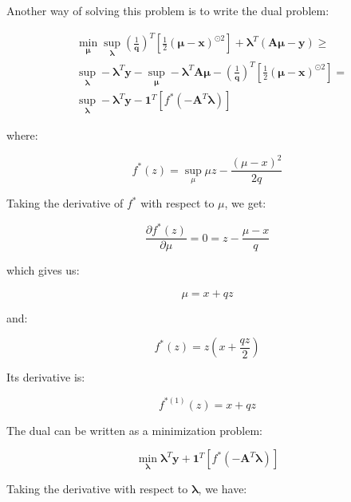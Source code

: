 \documentclass{tex/note}
\begin{document}
Another way of solving this problem is to write the dual problem:

\begin{align*}
& \min_{\bm{\mu}} \sup_{\bm{\lambda}} \left( \frac{1}{\bm{q}} \right)^T \left[ \frac{1}{2} \left( \bm{\mu} - \bm{x} \right)^{\odot 2} \right] + \bm{\lambda}^T \left( \bm{A} \bm{\mu} - \bm{y} \right) \geq \\
& \sup_{\bm{\lambda}} - \bm{\lambda}^T \bm{y} - \sup_{\bm{\mu}} - \bm{\lambda}^T \bm{A} \bm{\mu} - \left( \frac{1}{\bm{q}} \right)^T \left[ \frac{1}{2} \left( \bm{\mu} - \bm{x} \right)^{\odot 2} \right] = \\
& \sup_{\bm{\lambda}} - \bm{\lambda}^T \bm{y} -  \bm{1}^T \left[ f^* \left( - \bm{A}^T \bm{\lambda} \right) \right]
\end{align*}

where:

\begin{equation*}
f^* \left( z \right) = \sup_{\mu} \mu z - \frac{\left( \mu - x \right)^2}{2 q}
\end{equation*}

Taking the derivative of $f^*$ with respect to $\mu$, we get:

\begin{equation*}
\frac{\partial f^* \left( z \right)}{\partial \mu} = 0 = z - \frac{\mu - x}{q}
\end{equation*}

which gives us:

\begin{equation*}
\mu = x + q z
\end{equation*}

and:

\begin{equation*}
f^* \left( z \right) = z \left( x + \frac{q z}{2} \right)
\end{equation*}

Its derivative is:

\begin{equation*}
f^{* \left( 1 \right)} \left( z \right) = x + q z
\end{equation*}

The dual can be written as a minimization problem:

\begin{equation*}
\min_{\bm{\lambda}} \bm{\lambda}^T \bm{y} + \bm{1}^T \left[ f^* \left( - \bm{A}^T \bm{\lambda} \right) \right] 
\end{equation*}

Taking the derivative with respect to $\bm{\lambda}$, we have:
\end{document}
